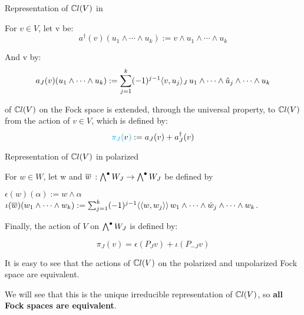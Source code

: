 \begin{frame}{Representation of $\mathbb C l(V)$ in \fjv} %
    
    For $v \in V$, let v be:
    \[ a^\dagger(v) (u_1 \wedge \cdots \wedge u_k) := v \wedge u_1 \wedge \cdots \wedge u_k \]
    
    And v by:
    \[ a_J(v) (u_1 \wedge \cdots \wedge u_k) := \sum_{j = 1}^k (-1)^{j-1} \langle v, u_j \rangle_J \, u_1 \wedge \cdots \wedge \hat u_j \wedge \cdots  \wedge u_k \]
    
     of $\mathbb C l(V)$ on the Fock space is extended, through the universal property, to $\mathbb C l(V)$ from the action of $v \in V$, which is defined by:
    \[ \textcolor{cyan}{\pi_J(}v\textcolor{cyan}{)} := a_J(v) + a_J^\dagger(v) \]
\end{frame}

\begin{frame}{Representation of $\mathbb C l(V)$ in polarized \fjv} %
    
    For $w \in W$, let w and $\overline{w}$ $:\bigwedge^\bullet W_J \to \bigwedge^\bullet W_J$ be defined by
    
    $\epsilon(w)(\alpha) := w \wedge \alpha$\\
    $\iota(\overline{w})(w_1 \wedge \cdots \wedge w_k) := \sum_{j = 1}^k (-1)^{j-1} \langle\langle w, w_j \rangle\rangle \, w_1 \wedge \cdots \wedge \hat w_j \wedge \cdots  \wedge w_k$.
    
    Finally, the action of $V$ on $\bigwedge^\bullet W_J$ is defined by:
    
    \[\pi_J(v) = \epsilon(P_J v) + \iota(P_{-J} v)\]
    
    It is easy to see that the actions of $\mathbb C l(V)$ on the polarized and unpolarized Fock space are equivalent.
    
    We will see that this is the unique irreducible representation of $\mathbb C l(V)$, so \textbf{all Fock spaces are equivalent}.
    
\end{frame}

